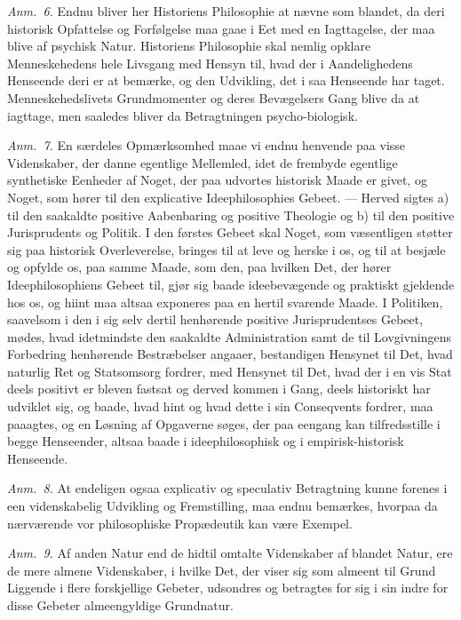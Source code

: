 \documentclass[12pt,a4paper]{book}
\begin{document}
{\small\emph{Anm.~6.} Endnu bliver her Historiens Philosophie at nævne som blandet,
da deri historisk Opfattelse og Forfølgelse maa gaae i Eet med en Iagttagelse, der
maa blive af psychisk Natur. Historiens Philosophie skal nemlig opklare
Menneskehedens hele Livsgang med Hensyn til, hvad der i Aandelighedens Henseende
deri er at bemærke, og den Udvikling, det i saa Henseende har taget.
Menneskehedslivets Grundmomenter og deres Bevægelsers Gang blive da at iagttage, men
saaledes bliver da Betragtningen psycho-biologisk.\par}

{\small\emph{Anm.~7.} En særdeles Opmærksomhed maae vi endnu henvende paa visse
Videnskaber, der danne egentlige Mellemled, idet de frembyde egentlige synthetiske
Eenheder af Noget, der paa udvortes historisk Maade er givet, og Noget, som hører
til den explicative Ideephilosophies Gebeet. --- Herved sigtes a) til den saakaldte
positive Aabenbaring og positive Theologie og b) til den positive Jurisprudents og
Politik. I den førstes Gebeet skal Noget, som væsentligen støtter sig paa historisk
Overleverelse, bringes til at leve og herske i os, og til at besjæle og opfylde os,
paa samme Maade, som den, paa hvilken Det, der hører Ideephilosophiens Gebeet til,
gjør sig baade ideebevægende og praktiskt gjeldende hos os, og hiint maa altsaa
exponeres paa en hertil svarende Maade. I Politiken, saavelsom i den i sig selv
dertil henhørende positive Jurisprudentses Gebeet, mødes, hvad idetmindste den
saakaldte Administration samt de til Lovgivningens Forbedring henhørende Bestræbelser
angaaer, bestandigen Hensynet til Det, hvad naturlig Ret og Statsomsorg fordrer, med
Hensynet til Det, hvad der i en vis Stat deels positivt er bleven fastsat og derved
kommen i Gang, deels historiskt har udviklet sig, og baade, hvad hint og hvad dette
i sin Conseqvents fordrer, maa paaagtes, og en Løsning af Opgaverne søges, der paa
eengang kan tilfredsstille i begge Henseender, altsaa baade i ideephilosophisk og i
empirisk-historisk Henseende.\par}

{\small\emph{Anm.~8.} At endeligen ogsaa explicativ og speculativ Betragtning kunne
forenes i een videnskabelig Udvikling og Fremstilling, maa endnu bemærkes, hvorpaa
da nærværende vor philosophiske Propædeutik kan være Exempel.\par}

{\small\emph{Anm.~9.} Af anden Natur end de hidtil omtalte Videnskaber af blandet
Natur, ere de mere almene Videnskaber, i hvilke Det, der viser sig som almeent til
Grund Liggende i flere forskjellige Gebeter, udsondres og betragtes for sig i sin
indre for disse Gebeter almeengyldige Grundnatur.\par}
\end{document}
